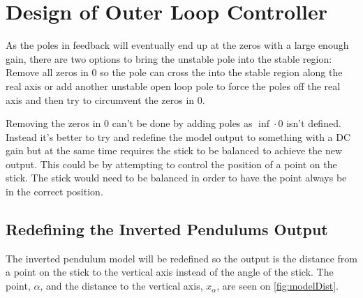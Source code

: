 

\section{Design of Outer Loop Controller}
As the poles in feedback will eventually end up at the zeros with a large enough gain, there are two options to bring the unstable pole into the stable region: Remove all zeros in 0 so the pole can cross the into the stable region along the real axis or add another unstable open loop pole to force the poles off the real axis and then try to circumvent the zeros in 0. 

Removing the zeros in 0 can't be done by adding poles as $\inf\cdot0$ isn't defined. Instead it's better to try and redefine the model output to something with a DC gain but at the same time requires the stick to be balanced to achieve the new output. This could be by attempting to control the position of a point on the stick. The stick would need to be balanced in order to have the point always be in the correct position.


\subsection{Redefining the Inverted Pendulums Output}
The inverted pendulum model will be redefined so the output is the distance from a point on the stick to the vertical axis instead of the angle of the stick. The point, $\alpha$, and the distance to the vertical axis, $x_\alpha$, are seen on \autoref{fig:modelDist}.

